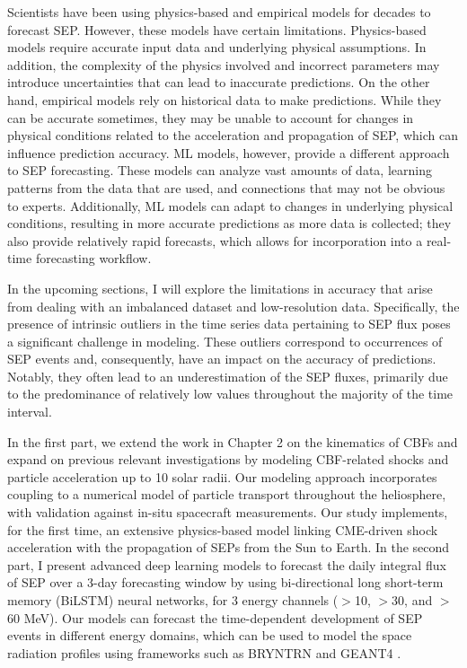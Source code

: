 Scientists have been using physics-based and empirical models for decades to forecast SEP. However, these models have certain limitations. Physics-based models require accurate input data and underlying physical assumptions. In addition, the complexity of the physics involved and incorrect parameters may introduce uncertainties that can lead to inaccurate predictions.
On the other hand, empirical models rely on historical data to make predictions.
While they can be accurate sometimes, they may be unable to account for changes in physical conditions related to the acceleration and propagation of SEP, which can influence prediction accuracy.
ML models, however, provide a different approach to SEP forecasting. These models can analyze vast amounts of data, learning patterns from the data that are used, and connections that may not be obvious to experts. Additionally, ML models can adapt to changes in underlying physical conditions, resulting in more accurate predictions as more data is collected; they also provide relatively rapid forecasts, which allows for incorporation into a real-time forecasting workflow.

In the upcoming sections, I will explore the limitations in accuracy that arise from dealing with an imbalanced dataset and low-resolution data. Specifically, the presence of intrinsic outliers in the time series data pertaining to SEP flux poses a significant challenge in modeling. These outliers correspond to occurrences of SEP events and, consequently, have an impact on the accuracy of predictions. Notably, they often lead to an underestimation of the SEP fluxes, primarily due to the predominance of relatively low values throughout the majority of the time interval.

In the first part, we extend the work in Chapter 2 on the kinematics of CBFs and expand on previous relevant investigations by modeling CBF-related shocks and particle acceleration up to 10 solar radii. Our modeling approach incorporates coupling to a numerical model of particle transport throughout the heliosphere, with validation against in-situ spacecraft measurements. Our study implements, for the first time, an extensive physics-based model linking CME-driven shock acceleration with the propagation of SEPs from the Sun to Earth. In the second part, I present advanced deep learning models to forecast the daily integral flux of SEP over a 3-day forecasting window by using bi-directional long short-term memory (BiLSTM) neural networks, for 3 energy channels ($>$10, $>$30, and $>$60 MeV). Our models can forecast the time-dependent development of SEP events in different energy domains, which can be used to model the space radiation profiles using frameworks such as BRYNTRN \cite{wilson_1988} and GEANT4 \citep{truscott_2000}.

